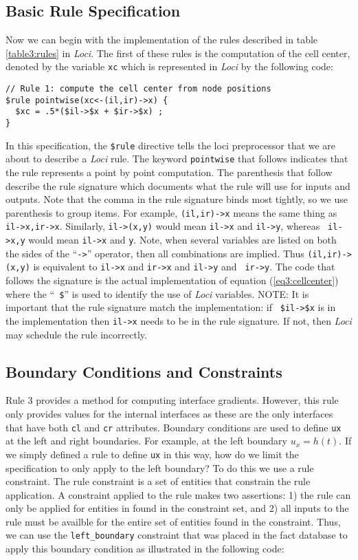\documentclass[10pt,epsf]{book}
\begin{document}
\subsection{Basic Rule Specification}
Now we can begin with the implementation of the rules described in
table \ref{table3:rules} in {\it Loci}.  The first of these rules is the
computation of the cell center, denoted by the variable {\tt xc} which
is represented in {\it Loci} by the following code:
\begin{verbatim}
// Rule 1: compute the cell center from node positions
$rule pointwise(xc<-(il,ir)->x) {
  $xc = .5*($il->$x + $ir->$x) ;
}
\end{verbatim}
In this specification, the {\tt \$rule} directive tells the loci
preprocessor that we are about to describe a {\it Loci} rule.  The keyword
{\tt pointwise} that follows indicates that the rule represents a
point by point computation.  The parenthesis that follow describe the
rule signature which documents what the rule will use for inputs and
outputs.  Note that the comma in the rule signature binds most
tightly, so we use parenthesis to group items.  For example,
{\tt(il,ir)->x} means the same thing as {\tt il->x,ir->x}.  Similarly,
{\tt il->(x,y)} would mean {\tt il->x} and {\tt il->y}, whereas {\tt
  il->x,y} would mean {\tt il->x} and {\tt y}.  Note, when several
variables are listed on both the sides of the ``{\tt ->}'' operator,
then all combinations are implied.  Thus {\tt (il,ir)->(x,y)} is
equivalent to {\tt il->x} and {\tt ir->x} and {\tt il->y} and {\tt
  ir->y}.  The code that follows the signature is the actual
implementation of equation (\ref{eq3:cellcenter}) where the ``{\tt
  \$}'' is used to identify the use of {\it Loci} variables.  NOTE: It is
important that the rule signature match the implementation: if {\tt
  \$il->\$x} is in the implementation then {\tt il->x} needs to be in
the rule signature.  If not, then {\it Loci} may schedule the rule
incorrectly.

\subsection{Boundary Conditions and Constraints}

Rule 3 provides a method for computing interface gradients.  However,
this rule only provides values for the internal interfaces as these
are the only interfaces that have both {\tt cl} and {\tt cr}
attributes.  Boundary conditions are used to define {\tt ux} at the
left and right boundaries. For example, at the left boundary $u_x =
h(t)$.   If we simply defined a rule to define {\tt ux} in this way,
how do we limit the specification to only apply to the left boundary?
To do this we use a rule constraint.  The rule constraint is a set of
entities that constrain the rule application.  A constraint applied to
the rule makes two assertions: 1) the rule can only be applied for
entities in found in the constraint set, and 2) all inputs to the rule
must be availble for the entire set of entities found in the
constraint. Thus, we can use the {\tt left\_boundary} constraint that
was placed in the fact database to apply this boundary condition as
illustrated in the following code:
\end{document}
